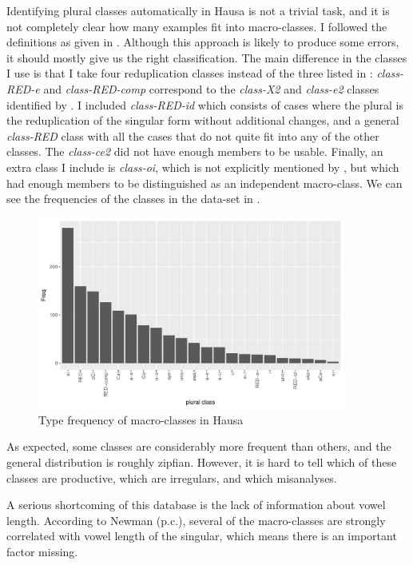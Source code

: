 Identifying plural classes automatically in Hausa is not a trivial task, and it is not completely clear how many examples fit into  macro-classes. I followed the definitions as given in . Although this approach is likely to produce some errors, it should mostly give us the right classification. The main difference in the classes I use is that I take four reduplication classes instead of the three listed in : \textit{class-RED-e} and \textit{class-RED-comp} correspond to the \textit{class-X2} and \textit{class-e2} classes identified by \textcite{Newman.2000}. I included \textit{class-RED-id} which consists of cases where the plural is the reduplication of the singular form without additional changes, and a general \textit{class-RED} class with all the cases that do not quite fit into any of the other classes. The \textit{class-ce2} did not have enough members to be usable. Finally, an extra class I include is \textit{class-oi}, which is not explicitly mentioned by \textcite{Newman.2000}, but which had enough members to be distinguished as an independent macro-class. We can see the frequencies of the classes in the data-set in .

\begin{figure}
  \includegraphics[width=0.9\textwidth]{./figures/hausa/class-freqs.pdf}
  \caption{Type frequency of macro-classes in Hausa}\label{fig:class-hausa-freqs}
\end{figure}

As expected, some classes are considerably more frequent than others, and the general distribution is roughly zipfian. However, it is hard to tell which of these classes are productive, which are irregulars, and which misanalyses.

A serious shortcoming of this database is the lack of information about vowel length. According to Newman (p.c.), several of the macro-classes are strongly correlated with vowel length of the singular, which means there is an important factor missing.

